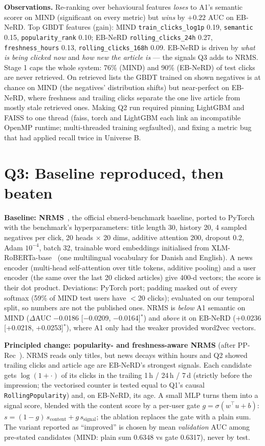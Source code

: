 \documentclass[10pt]{article}
\begin{document}
\textbf{Observations.} Re-ranking over behavioural features \emph{loses} to A1's semantic scorer on MIND
(significant on every metric) but \emph{wins} by $+0.22$ AUC on EB-NeRD. Top GBDT features (gain):
MIND \texttt{train\_clicks\_log1p} 0.19, \texttt{semantic} 0.15, \texttt{popularity\_rank} 0.10; EB-NeRD \texttt{rolling\_clicks\_24h} 0.27, \texttt{freshness\_hours} 0.13, \texttt{rolling\_clicks\_168h} 0.09. EB-NeRD is driven by \emph{what is being clicked now} and
\emph{how new the article is} --- the signals Q3 adds to NRMS. Stage 1 caps the whole system: 76\% (MIND) and
90\% (EB-NeRD) of test clicks are never retrieved. On retrieved lists the GBDT trained on shown negatives is at
chance on MIND (the negatives' distribution shifts) but near-perfect on EB-NeRD, where freshness and trailing
clicks separate the one live article from mostly stale retrieved ones. Making Q2 run required pinning LightGBM
and FAISS to one thread (faiss, torch and LightGBM each link an incompatible OpenMP runtime; multi-threaded
training segfaulted), and fixing a metric bug that had applied recall twice in Universe B.
\section{Q3: Baseline reproduced, then beaten}
\textbf{Baseline: NRMS}~\cite{nrms}, the official ebnerd-benchmark baseline, ported to PyTorch with the
benchmark's hyperparameters: title length 30, history 20, 4 sampled negatives per click, 20 heads $\times$ 20
dims, additive attention 200, dropout 0.2, Adam $10^{-4}$, batch 32, trainable word embeddings initialised from
XLM-RoBERTa-base~\cite{xlmr} (one multilingual vocabulary for Danish and English). A news encoder (multi-head
self-attention over title tokens, additive pooling) and a user encoder (the same over the last 20 clicked
articles) give 400-d vectors; the score is their dot product. Deviations: PyTorch port; padding masked out of
every softmax (59\% of MIND test users have $<$20 clicks); evaluated on our temporal split, so numbers are not
the published ones. NRMS is \emph{below} A1 semantic on MIND ($\Delta$AUC $-$0.0186 [$-$0.0209, $-$0.0164]$^{*}$) and \emph{above} it
on EB-NeRD (+0.0236 [+0.0218, +0.0253]$^{*}$), where A1 only had the weaker provided word2vec vectors.

\textbf{Principled change: popularity- and freshness-aware NRMS} (after PP-Rec~\cite{pprec}). NRMS reads only
titles, but news decays within hours and Q2 showed trailing clicks and article age are EB-NeRD's strongest
signals. Each candidate gets $\log(1+\cdot)$ of its clicks in the trailing 1\,h / 24\,h / 7\,d (strictly before the
impression; the vectorised counter is tested equal to Q1's causal \texttt{RollingPopularity}) and, on EB-NeRD, its
age. A small MLP turns them into a signal score, blended with the content score by a per-user gate
$g=\sigma(w^\top u+b)$: $s=(1-g)\,s_\text{content}+g\,s_\text{signal}$; the ablation replaces the gate with a plain
sum. The variant reported as ``improved'' is chosen by mean \emph{validation} AUC among pre-stated candidates
(MIND: plain sum 0.6348 vs gate 0.6317), never by test.
\end{document}
